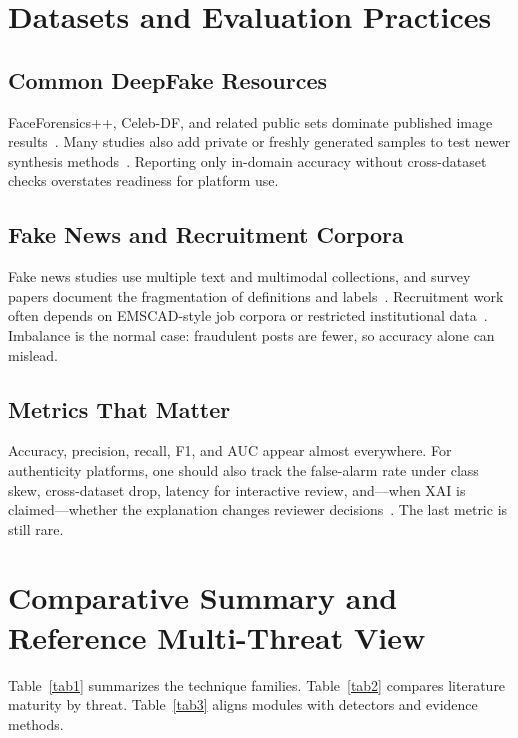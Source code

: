 \documentclass[runningheads]{llncs}
\begin{document}
\section{Datasets and Evaluation Practices}
\label{sec:data}

\subsection{Common DeepFake Resources}
FaceForensics++, Celeb-DF, and related public sets dominate published image results~\cite{r18,r08,r09}. Many studies also add private or freshly generated samples to test newer synthesis methods~\cite{r04,r07}. Reporting only in-domain accuracy without cross-dataset checks overstates readiness for platform use.

\subsection{Fake News and Recruitment Corpora}
Fake news studies use multiple text and multimodal collections, and survey papers document the fragmentation of definitions and labels~\cite{r21,r31,r34}. Recruitment work often depends on EMSCAD-style job corpora or restricted institutional data~\cite{r38,r37}. Imbalance is the normal case: fraudulent posts are fewer, so accuracy alone can mislead.

\subsection{Metrics That Matter}
Accuracy, precision, recall, F1, and AUC appear almost everywhere. For authenticity platforms, one should also track the false-alarm rate under class skew, cross-dataset drop, latency for interactive review, and---when XAI is claimed---whether the explanation changes reviewer decisions~\cite{r19,r29}. The last metric is still rare.

\section{Comparative Summary and Reference Multi-Threat View}
\label{sec:compare}
Table~\ref{tab1} summarizes the technique families. Table~\ref{tab2} compares literature maturity by threat. Table~\ref{tab3} aligns modules with detectors and evidence methods.
\end{document}
